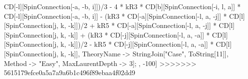 CD[-l][SpinConnection[-a, -b, i]])/3 - 4 * kR3 * CD[b][SpinConnection[-i, l, a]] * CD[-l][SpinConnection[-a, -b, i]] - (kR3 * CD[-a][SpinConnection[-l, a, -j]] * CD[l][SpinConnection[j, k, -k]])/2 + kR5 * CD[-a][SpinConnection[-l, a, -j]] * CD[l][SpinConnection[j, k, -k]] + (kR3 * CD[-j][SpinConnection[-l, a, -a]] * CD[l][SpinConnection[j, k, -k]])/2 - kR5 * CD[-j][SpinConnection[-l, a, -a]] * CD[l][SpinConnection[j, k, -k]], TheoryName -> StringJoin["Case", ToString[11]], Method -> "Easy", MaxLaurentDepth -> 3]; , -100]
>>>>>>> 5615179efce0a5a7a9a6b1c496f89ebaa4f02dd9
